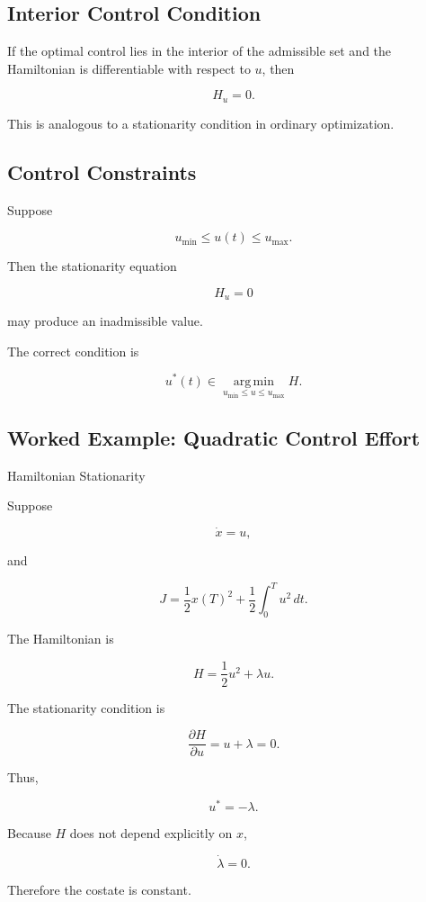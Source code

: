 \subsection{Interior Control Condition}
\label{subsec:interior-control-condition}

If the optimal control lies in the interior of the admissible set and the
Hamiltonian is differentiable with respect to \(u\), then

\[
\boxed{
H_u
=
0.
}
\]

This is analogous to a stationarity condition in ordinary optimization.

\subsection{Control Constraints}
\label{subsec:optimal-control-control-constraints}

Suppose

\[
\boxed{
u_{\min}
\leq
u(t)
\leq
u_{\max}.
}
\]

Then the stationarity equation

\[
H_u=0
\]

may produce an inadmissible value.

The correct condition is

\[
\boxed{
u^*(t)
\in
\operatorname*{arg\,min}_{
u_{\min}\leq u\leq u_{\max}
}
H.
}
\]

\subsection{Worked Example: Quadratic Control Effort}
\label{subsec:worked-quadratic-control}

\begin{workedexamplebox}{Hamiltonian Stationarity}

Suppose

\[
\dot{x}=u,
\]

and

\[
J
=
\frac12x(T)^2
+
\frac12
\int_0^T
u^2\,dt.
\]

The Hamiltonian is

\[
H
=
\frac12u^2
+
\lambda u.
\]

The stationarity condition is

\[
\frac{\partial H}{\partial u}
=
u+\lambda
=
0.
\]

Thus,

\begin{answerbox}
\[
\boxed{
u^*
=
-\lambda.
}
\]
\end{answerbox}

Because \(H\) does not depend explicitly on \(x\),

\[
\dot{\lambda}=0.
\]

Therefore the costate is constant.

\end{workedexamplebox}

